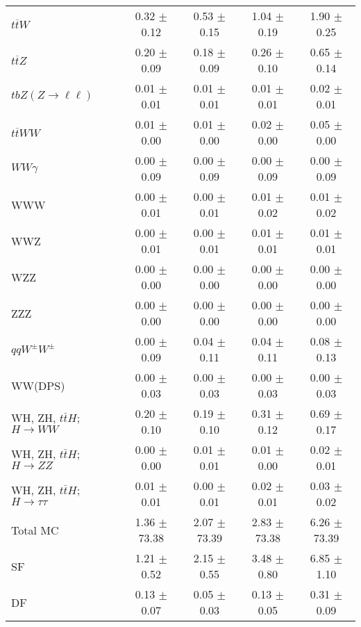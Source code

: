 \begin{tabular}{l|cccc}
                   $t\overline{t}W$ &  0.32 $\pm$  0.12 &  0.53 $\pm$  0.15 &  1.04 $\pm$  0.19 &  1.90 $\pm$  0.25 \\
                   $t\overline{t}Z$ &  0.20 $\pm$  0.09 &  0.18 $\pm$  0.09 &  0.26 $\pm$  0.10 &  0.65 $\pm$  0.14 \\
    $tbZ (Z \rightarrow \ell \ell)$ &  0.01 $\pm$  0.01 &  0.01 $\pm$  0.01 &  0.01 $\pm$  0.01 &  0.02 $\pm$  0.01 \\
                  $t\overline{t}WW$ &  0.01 $\pm$  0.00 &  0.01 $\pm$  0.00 &  0.02 $\pm$  0.00 &  0.05 $\pm$  0.00 \\
                         $WW\gamma$ &  0.00 $\pm$  0.09 &  0.00 $\pm$  0.09 &  0.00 $\pm$  0.09 &  0.00 $\pm$  0.09 \\
                                WWW &  0.00 $\pm$  0.01 &  0.00 $\pm$  0.01 &  0.01 $\pm$  0.02 &  0.01 $\pm$  0.02 \\
                                WWZ &  0.00 $\pm$  0.01 &  0.00 $\pm$  0.01 &  0.01 $\pm$  0.01 &  0.01 $\pm$  0.01 \\
                                WZZ &  0.00 $\pm$  0.00 &  0.00 $\pm$  0.00 &  0.00 $\pm$  0.00 &  0.00 $\pm$  0.00 \\
                                ZZZ &  0.00 $\pm$  0.00 &  0.00 $\pm$  0.00 &  0.00 $\pm$  0.00 &  0.00 $\pm$  0.00 \\
                 $qqW^{\pm}W^{\pm}$ &  0.00 $\pm$  0.09 &  0.04 $\pm$  0.11 &  0.04 $\pm$  0.11 &  0.08 $\pm$  0.13 \\
                            WW(DPS) &  0.00 $\pm$  0.03 &  0.00 $\pm$  0.03 &  0.00 $\pm$  0.03 &  0.00 $\pm$  0.03 \\
WH, ZH, $t\bar{t}H$; $H \rightarrow WW$ &  0.20 $\pm$  0.10 &  0.19 $\pm$  0.10 &  0.31 $\pm$  0.12 &  0.69 $\pm$  0.17 \\
WH, ZH, $t\bar{t}H$; $H \rightarrow ZZ$ &  0.00 $\pm$  0.00 &  0.01 $\pm$  0.01 &  0.01 $\pm$  0.00 &  0.02 $\pm$  0.01 \\
WH, ZH, $t\bar{t}H$; $H \rightarrow \tau\tau$ &  0.01 $\pm$  0.01 &  0.00 $\pm$  0.01 &  0.02 $\pm$  0.01 &  0.03 $\pm$  0.02 \\
\hline\hline
                           Total MC &  1.36 $\pm$ 73.38 &  2.07 $\pm$ 73.39 &  2.83 $\pm$ 73.38 &  6.26 $\pm$ 73.39 \\
\hline
                                 SF &  1.21 $\pm$  0.52 &  2.15 $\pm$  0.55 &  3.48 $\pm$  0.80 &  6.85 $\pm$  1.10 \\
                                 DF &  0.13 $\pm$  0.07 &  0.05 $\pm$  0.03 &  0.13 $\pm$  0.05 &  0.31 $\pm$  0.09 \\

\end{tabular}
